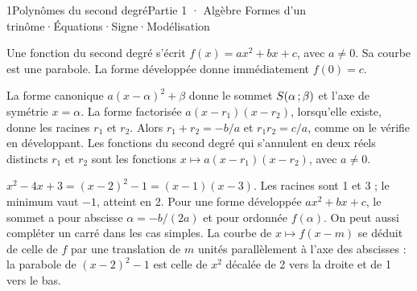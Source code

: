 \begin{ouverture}[seconddegre]{1}{Polynômes du second degré}{Partie 1 · Algèbre}
{Formes d'un trinôme\enspace·\enspace Équations\enspace·\enspace Signe\enspace·\enspace Modélisation}
\end{ouverture}
\essentiel
{}
\begin{definition}[Trinôme]
Une fonction du second degré s'écrit $f(x)=ax^2+bx+c$, avec $a\neq0$.
Sa courbe est une parabole. La forme développée donne immédiatement $f(0)=c$.
\end{definition}
\begin{propriete}
La forme canonique $a(x-\alpha)^2+\beta$ donne le sommet $S(\alpha\,{;}\,\beta)$
et l'axe de symétrie $x=\alpha$. La forme factorisée $a(x-r_1)(x-r_2)$, lorsqu'elle
existe, donne les racines $r_1$ et $r_2$.
Alors $r_1+r_2=-b/a$ et $r_1r_2=c/a$, comme on le vérifie en développant.
Les fonctions du second degré qui s'annulent en deux réels distincts $r_1$ et $r_2$
sont les fonctions $x\mapsto a(x-r_1)(x-r_2)$, avec $a\neq0$.
\end{propriete}
\begin{exemple}
$x^2-4x+3=(x-2)^2-1=(x-1)(x-3)$.
Les racines sont 1 et 3 ; le minimum vaut $-1$, atteint en 2.
Pour une forme développée $ax^2+bx+c$, le sommet a pour abscisse $\alpha=-b/(2a)$
et pour ordonnée $f(\alpha)$. On peut aussi compléter un carré dans les cas simples.
La courbe de $x\mapsto f(x-m)$ se déduit de celle de $f$ par une translation de $m$
unités parallèlement à l'axe des abscisses : la parabole de $(x-2)^2-1$ est celle de $x^2$
décalée de 2 vers la droite et de 1 vers le bas.
\end{exemple}
\begin{center}
\par
{}
\end{center}
